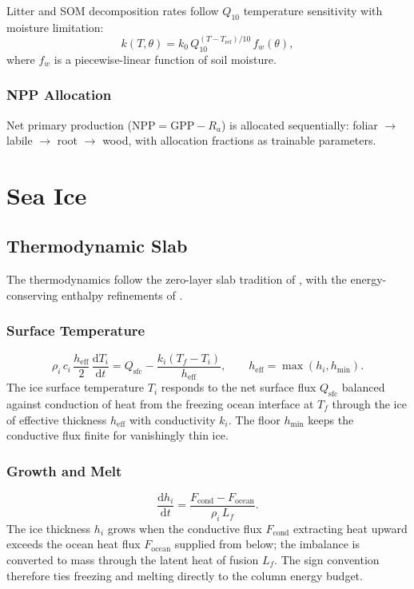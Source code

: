 \documentclass[11pt,twoside]{report}
\newcommand{\dd}{\mathrm{d}}
\newcommand{\Lf}{L_f}
\begin{document}
Litter and SOM decomposition rates follow $Q_{10}$ temperature sensitivity with moisture limitation:
\begin{equation}
  k(T,\theta) = k_0\,Q_{10}^{(T-T_{\mathrm{ref}})/10}\,f_w(\theta),
\end{equation}
where $f_w$ is a piecewise-linear function of soil moisture.

\subsection{NPP Allocation}

Net primary production ($\mathrm{NPP}=\mathrm{GPP}-R_a$) is allocated sequentially: foliar $\to$ labile $\to$ root $\to$ wood, with allocation fractions as trainable parameters.


\chapter{Sea Ice}
\label{ch:ice}

\section{Thermodynamic Slab}

The thermodynamics follow the zero-layer slab tradition of \citet{Semtner1976},
with the energy-conserving enthalpy refinements of \citet{BitzLipscomb1999}.

\subsection{Surface Temperature}
\begin{equation}
  \rho_i\,c_i\,\frac{h_{\mathrm{eff}}}{2}\,\frac{\dd T_i}{\dd t}
  = Q_{\mathrm{sfc}} - \frac{k_i(T_f-T_i)}{h_{\mathrm{eff}}},
  \qquad h_{\mathrm{eff}}=\max(h_i,h_{\min}).
\end{equation}
The ice surface temperature $T_i$ responds to the net surface flux $Q_{\mathrm{sfc}}$
balanced against conduction of heat from the freezing ocean interface at $T_f$
through the ice of effective thickness $h_{\mathrm{eff}}$ with conductivity
$k_i$.  The floor $h_{\min}$ keeps the conductive flux finite for vanishingly
thin ice.

\subsection{Growth and Melt}
\begin{equation}
  \frac{\dd h_i}{\dd t} = \frac{F_{\mathrm{cond}}-F_{\mathrm{ocean}}}
  {\rho_i\,\Lf}.
\end{equation}
The ice thickness $h_i$ grows when the conductive flux $F_{\mathrm{cond}}$
extracting heat upward exceeds the ocean heat flux $F_{\mathrm{ocean}}$ supplied
from below; the imbalance is converted to mass through the latent heat of fusion
$\Lf$.  The sign convention therefore ties freezing and melting directly to the
column energy budget.
\end{document}
